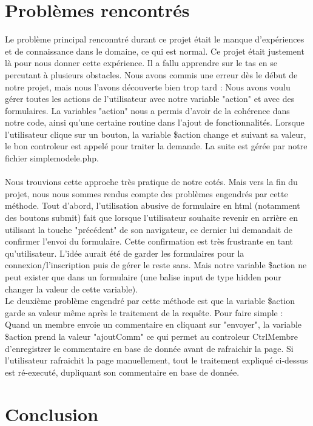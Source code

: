 \documentclass{article}
\begin{document}
    \section{Problèmes rencontrés}
    Le problème principal renconntré durant ce projet était le manque d'expériences et de connaissance dans le domaine, ce qui est normal.
    Ce projet était justement là pour nous donner cette expérience. Il a fallu apprendre sur le tas en se percutant à plusieurs obstacles.
    Nous avons commis une erreur dès le début de notre projet, mais nous l'avons découverte bien trop tard : Nous avons voulu gérer toutes
    les actions de l'utilisateur avec notre variable "action" et avec des formulaires. La variables "action" nous a permis d'avoir de la
    cohérence dans notre code, ainsi qu'une certaine routine dans l'ajout de fonctionnalités. Lorsque l'utilisateur clique sur un bouton,
    la variable \$action change et suivant sa valeur, le bon controleur est appelé pour traiter la demande. La suite est gérée par notre
    fichier simplemodele.php.\\\\
    Nous trouvions cette approche très pratique de notre cotés. Mais vers la fin du projet, nous nous sommes rendus compte des problèmes
    engendrés par cette méthode. Tout d'abord, l'utilisation abusive de formulaire en html (notamment des boutons submit) fait que lorsque
    l'utilisateur souhaite revenir en arrière en utilisant la touche "précédent" de son navigateur, ce dernier lui demandait de confirmer
    l'envoi du formulaire. Cette confirmation est très frustrante en tant qu'utilisateur. L'idée aurait été de garder les formulaires
    pour la connexion/l'inscription puis de gérer le reste sans. Mais notre variable \$action ne peut exister que dans un formulaire 
    (une balise input de type hidden pour changer la valeur de cette variable).\\
    Le deuxième problème engendré par cette méthode est que la variable \$action garde sa valeur même après le traitement de la requête.
    Pour faire simple : Quand un membre envoie un commentaire en cliquant sur "envoyer", la variable \$action prend la valeur "ajoutComm"
    ce qui permet au controleur CtrlMembre d'enregistrer le commentaire en base de donnée avant de rafraichir la page. Si l'utilisateur
    rafraichit la page manuellement, tout le traitement expliqué ci-dessus est ré-executé, dupliquant son commentaire en base de donnée.

    \section{Conclusion}
    
\end{document}
